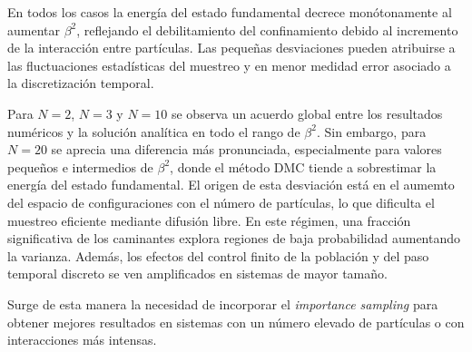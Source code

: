 \documentclass[11pt,a4paper,twoside,pdf]{article}
\numberwithin{equation}{section}
\begin{document}
En todos los casos la energía del estado fundamental decrece monótonamente al aumentar $\beta^2$, reflejando el debilitamiento del confinamiento debido al incremento de la interacción entre partículas. Las pequeñas desviaciones pueden atribuirse a las fluctuaciones estadísticas del muestreo y en menor medidad error asociado a la discretización temporal.



Para $N=2$, $N=3$ y $N=10$ se observa un acuerdo global entre los resultados numéricos y la solución analítica en todo el rango de $\beta^2$. Sin embargo, para $N=20$ se aprecia una diferencia más pronunciada, especialmente para valores pequeños e intermedios de $\beta^2$, donde el método DMC tiende a sobrestimar la energía del estado fundamental. El origen de esta desviación está en el aumemto del espacio de configuraciones con el número de partículas, lo que dificulta el muestreo eficiente mediante difusión libre. En este régimen, una fracción significativa de los caminantes explora regiones de baja probabilidad aumentando la varianza. Además, los efectos del control finito de la población y del paso temporal discreto se ven amplificados en sistemas de mayor tamaño.

Surge de esta manera la necesidad de incorporar el \textit{importance sampling} para obtener mejores resultados en sistemas con un número elevado de partículas o con interacciones más intensas.
\end{document}
